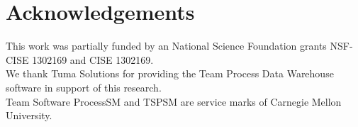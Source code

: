\documentclass{sig-alternate}
\newcommand{\fig}[1]{Figure~\ref{fig:#1}}
\begin{document}



\section*{Acknowledgements}
This work was partially funded by an National Science
Foundation grants NSF-CISE 1302169 and CISE 1302169. 
\\
We thank Tuma Solutions for providing the Team Process Data Warehouse software in support of this research.  \\
Team Software ProcessSM and TSPSM are service marks of Carnegie Mellon University.


\clearpage
\vspace*{0.5mm}
\scriptsize

 
\end{document}
